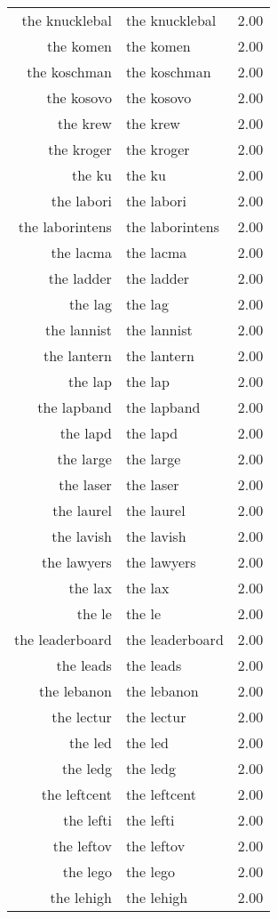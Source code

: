 \begin{table}[ht]
\begin{tabular}{rlr}
  the knucklebal & the knucklebal & 2.00 \\ 
  the komen & the komen & 2.00 \\ 
  the koschman & the koschman & 2.00 \\ 
  the kosovo & the kosovo & 2.00 \\ 
  the krew & the krew & 2.00 \\ 
  the kroger & the kroger & 2.00 \\ 
  the ku & the ku & 2.00 \\ 
  the labori & the labori & 2.00 \\ 
  the laborintens & the laborintens & 2.00 \\ 
  the lacma & the lacma & 2.00 \\ 
  the ladder & the ladder & 2.00 \\ 
  the lag & the lag & 2.00 \\ 
  the lannist & the lannist & 2.00 \\ 
  the lantern & the lantern & 2.00 \\ 
  the lap & the lap & 2.00 \\ 
  the lapband & the lapband & 2.00 \\ 
  the lapd & the lapd & 2.00 \\ 
  the large & the large & 2.00 \\ 
  the laser & the laser & 2.00 \\ 
  the laurel & the laurel & 2.00 \\ 
  the lavish & the lavish & 2.00 \\ 
  the lawyers & the lawyers & 2.00 \\ 
  the lax & the lax & 2.00 \\ 
  the le & the le & 2.00 \\ 
  the leaderboard & the leaderboard & 2.00 \\ 
  the leads & the leads & 2.00 \\ 
  the lebanon & the lebanon & 2.00 \\ 
  the lectur & the lectur & 2.00 \\ 
  the led & the led & 2.00 \\ 
  the ledg & the ledg & 2.00 \\ 
  the leftcent & the leftcent & 2.00 \\ 
  the lefti & the lefti & 2.00 \\ 
  the leftov & the leftov & 2.00 \\ 
  the lego & the lego & 2.00 \\ 
  the lehigh & the lehigh & 2.00 \\ 

\end{tabular}
\end{table}
